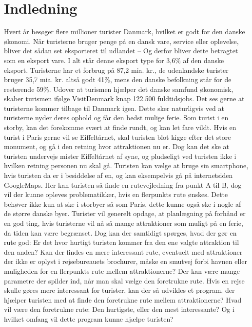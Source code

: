 \chapter{Indledning}

Hvert år besøger flere millioner turister Danmark, hvilket er godt for den danske økonomi. Når turisterne bruger penge på en dansk vare, service eller oplevelse, bliver det sådan set eksporteret til udlandet – Og derfor bliver dette betragtet som en eksport vare. I alt står denne eksport type for 3,6\% af den danske eksport. Turisterne har et forbrug på 87,2 mia. kr., de udenlandske turister bruger 35,7 mia. kr. altså godt 41\%, mens den danske befolkning står for de resterende 59\%. Udover at turismen hjælper det danske samfund økonomisk, skaber turismen ifølge VisitDenmark knap 122.500 fuldtidsjobs. \citep{faktaogtalVD}   \newline
Det ses gerne at turisterne kommer tilbage til Danmark igen. Dette sker naturligvis ved at turisterne nyder deres ophold og får den bedst mulige ferie. Som turist i en storby, kan det forekomme svært at finde rundt, og kan let fare vildt. Hvis en turist i Paris gerne vil se Eiffeltårnet, skal turisten blot kigge efter det store monument, og gå i den retning hvor attraktionen nu er. Dog kan det ske at turisten undervejs mister Eiffeltårnet af syne, og pludseligt ved turisten ikke i hvilken retning personen nu skal gå. Turisten kan vælge at bruge sin smartphone, hvis turisten da er i besiddelse af en, og kan eksempelvis gå på internetsiden GoogleMaps. Her kan turisten så finde en rutevejledning fra punkt A til B, dog vil der kunne opleves problematikker, hvis en flerpunkts rute ønskes. Dette behøver ikke kun at ske i storbyer så som Paris, dette kunne også ske i nogle af de større danske byer. \newline
Turister vil generelt opdage, at planlægning på forhånd er en god ting, hvis turisterne vil nå så mange attraktioner som muligt på en ferie, da tiden kan være begrænset. Dog kan der samtidigt spørges, hvad der gør en rute god: Er det hvor hurtigt turisten kommer fra den ene valgte attraktion til den anden? Kan der findes en mere interessant rute, eventuelt med attraktioner der ikke er oplyst i rejsebureauets brochurer, måske en smutvej forbi havnen eller muligheden for en flerpunkts rute mellem attraktionerne? Der kan være mange parametre der spilder ind, når man skal vælge den foretrukne rute. \newline
Hvis en rejse skulle gøres mere interessant for turister, kan der så udvikles et program, der hjælper turisten med at finde den foretrukne rute mellem attraktionerne? Hvad vil være den foretrukne rute: Den hurtigste, eller den mest interessante? Og i hvilket omfang vil dette program kunne hjælpe turisten? \newline
